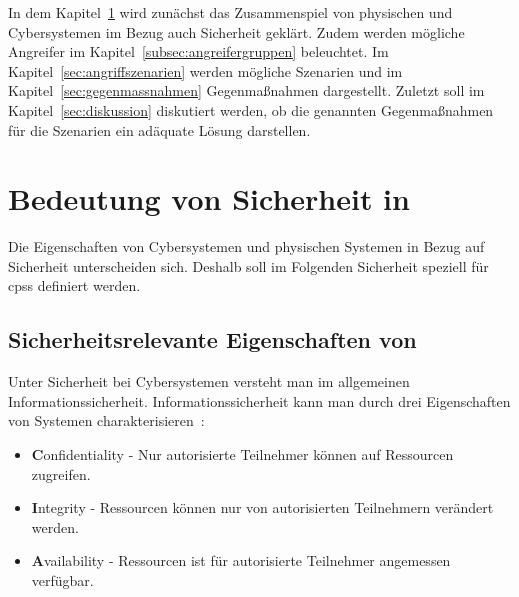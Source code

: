 \documentclass[final,bibliography=totocnumbered]{include/sikseminar}
\newcommand{\fb}[1]{\dofb#1}
\newcommand{\cps}{\glspl{cps}\xspace}
\newcommand{\dofb}[1]{\textbf{#1}\nobreak\hspace{0pt}}
\begin{document}
In dem Kapitel~\ref{sec:bedeutung-sicherheit} wird zunächst das Zusammenspiel von physischen und Cybersystemen im Bezug auch Sicherheit geklärt.
Zudem werden mögliche Angreifer im Kapitel~\ref{subsec:angreifergruppen} beleuchtet.
Im Kapitel~\ref{sec:angriffszenarien} werden mögliche Szenarien und im Kapitel~\ref{sec:gegenmassnahmen} Gegenmaßnahmen dargestellt.
Zuletzt soll im Kapitel~\ref{sec:diskussion} diskutiert werden, ob die genannten Gegenmaßnahmen für die Szenarien ein adäquate Lösung darstellen.

\section{Bedeutung von Sicherheit in }\label{sec:bedeutung-sicherheit}

Die Eigenschaften von Cybersystemen und physischen Systemen in Bezug auf Sicherheit unterscheiden sich.
Deshalb soll im Folgenden Sicherheit speziell für \cps definiert werden.

\subsection{Sicherheitsrelevante Eigenschaften von }\label{subsec:definition}
Unter Sicherheit bei Cybersystemen versteht man im allgemeinen Informationssicherheit.
Informationssicherheit kann man durch drei Eigenschaften von Systemen charakterisieren~\cite{CH13}:
\begin{itemize}[noitemsep,wide=0pt]
    \item \fb{Confidentiality} - Nur autorisierte Teilnehmer können auf Ressourcen zugreifen.\label{def:confidentiality}
    \item \fb{Integrity} - Ressourcen können nur von autorisierten Teilnehmern verändert werden.\label{def:integrity}
    \item \fb{Availability} - Ressourcen ist für autorisierte Teilnehmer angemessen verfügbar.\label{def:availability}
\end{itemize}
\end{document}
